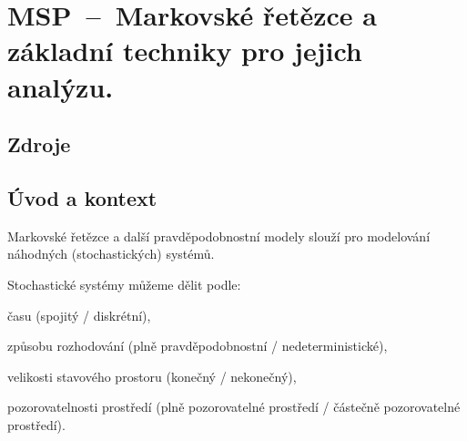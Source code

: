 

\graphicspath{{msp/markovske_retezce/figures}}


\chapter{MSP~--~Markovské řetězce a základní techniky pro jejich analýzu.}


\section{Zdroje}

\begin{compactitem}
    \item {}
    \item {}
    \item {}
    \item {}
\end{compactitem}


\section{Úvod a kontext}

\begin{compactitem}
    \item Markovské řetězce a další pravděpodobnostní modely slouží pro modelování náhodných (stochastických) systémů.

    \item Stochastické systémy můžeme dělit podle: \begin{compactitem}
        \item času (spojitý / diskrétní),
        \item způsobu rozhodování (plně pravděpodobnostní /  nedeterministické),
        \item velikosti stavového prostoru (konečný / nekonečný),
        \item pozorovatelnosti prostředí (plně pozorovatelné prostředí / částečně pozorovatelné prostředí).
    \end{compactitem}
\end{compactitem}

